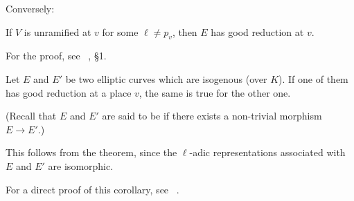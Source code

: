 Conversely:
\begin{thm}
If $V$ is unramified at $v$ for some $\ell \ne p_v$, then $E$ has good
reduction at $v$.
\end{thm}
For the proof, see \citeauthor{32}~\cite{32}, \S 1.

\begin{cor}
Let $E$ and $E'$ be two elliptic curves which are isogenous (over $K$). If one
of them has good reduction at a place $v$, the same is true for the other one.
\end{cor}
(Recall that $E$ and $E'$ are said to be  if there
\dpage
exists a non-trivial morphism $E \to E'$.)

This follows from the theorem, since the $\ell$-adic representations associated
with $E$ and $E'$ are isomorphic.

\begin{obs}
For a direct proof of this corollary, see \citeauthor{11}~\cite{11}.
\end{obs}

